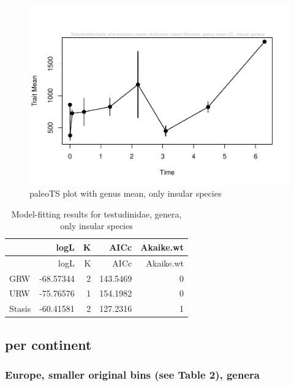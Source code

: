 \documentclass[]{article}
\begin{document}
\begin{figure}[htbp]
\centering
\includegraphics{MA_JJ_files/figure-latex/paleoTS plot with genus mean, excluding continental species-1.pdf}
\caption{paleoTS plot with genus mean, only insular species}
\end{figure}

\begin{longtable}[]{@{}lrrrr@{}}
\caption{Model-fitting results for testudinidae, genera, only insular
species}\tabularnewline
\toprule
& logL & K & AICc & Akaike.wt\tabularnewline
\midrule
\endfirsthead
\toprule
& logL & K & AICc & Akaike.wt\tabularnewline
\midrule
\endhead
GRW & -68.57344 & 2 & 143.5469 & 0\tabularnewline
URW & -75.76576 & 1 & 154.1982 & 0\tabularnewline
Stasis & -60.41581 & 2 & 127.2316 & 1\tabularnewline
\bottomrule
\end{longtable}

\newpage

\subsection{per continent}\label{per-continent}

\subsubsection{Europe, smaller original bins (see Table 2),
genera}\label{europe-smaller-original-bins-see-table-2-genera}
\end{document}
